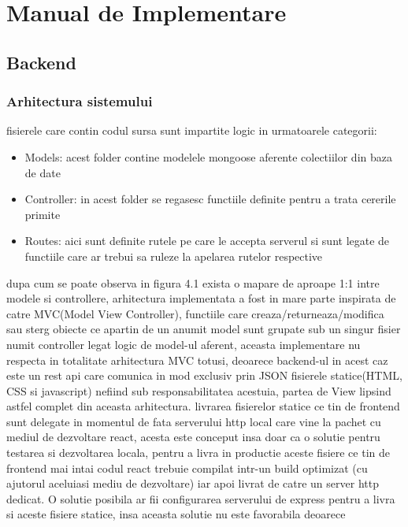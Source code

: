 \documentclass[12pt,a4paper,hidelinks]{report}
\theoremstyle{definition}
\theoremstyle{remark}
\begin{document}
\section{Manual de Implementare}
\subsection{Backend}
\subsubsection{Arhitectura sistemului}
fisierele care contin codul sursa sunt impartite logic in urmatoarele categorii:
    \begin{itemize}
        \item {
            Models: acest folder contine modelele mongoose aferente colectiilor din baza de date
        }
        \item {
            Controller: in acest folder se regasesc functiile definite pentru a trata cererile primite
        }
        \item{
            Routes: aici sunt definite rutele pe care le accepta serverul si sunt legate de functiile care ar trebui sa ruleze la apelarea rutelor respective
        }
    \end{itemize}
    dupa cum se poate observa in figura 4.1 exista o mapare de aproape 1:1 intre modele si controllere,
    arhitectura implementata a fost in mare parte inspirata de catre MVC(Model View Controller), functiile care creaza/returneaza/modifica sau sterg
    obiecte ce apartin de un anumit model sunt grupate sub un singur fisier numit controller legat logic de model-ul aferent, aceasta implementare
    nu respecta in totalitate arhitectura MVC totusi, deoarece backend-ul in acest caz este un rest api care comunica in mod exclusiv prin JSON
    fisierele statice(HTML, CSS si javascript) nefiind sub responsabilitatea acestuia, partea de View lipsind astfel complet din aceasta arhitectura.
    livrarea fisierelor statice ce tin de frontend sunt delegate in momentul de fata serverului http local care vine la pachet cu mediul de dezvoltare react,
    acesta este conceput insa doar ca o solutie pentru testarea si dezvoltarea locala, pentru a livra in productie aceste fisiere ce tin de frontend
    mai intai codul react trebuie compilat intr-un build optimizat (cu ajutorul aceluiasi mediu de dezvoltare) iar apoi livrat de catre un server http dedicat.
    O solutie posibila ar fii configurarea serverului de express pentru a livra si aceste fisiere statice, insa aceasta solutie nu este favorabila deoarece
\end{document}
